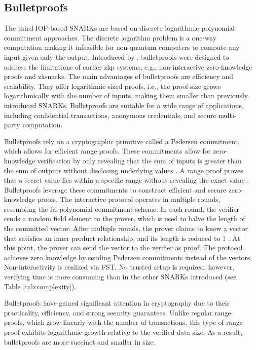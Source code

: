 \subsection{Bulletproofs}
The third IOP-based SNARKs are based on discrete logarithmic polynomial commitment approaches. The discrete logarithm problem is a one-way computation making it infeasible for non-quantum computers to compute any input given only the output. Introduced by \citet{bulletproofs}, bulletproofs were designed to address the limitations of earlier \acrshort{zkp} systems, e.g., non-interactive zero-knowledge proofs and \acrshort{zksnark}s. The main advantages of bulletproofs are efficiency and scalability. They offer logarithmic-sized proofs, i.e., the proof size grows logarithmically with the number of inputs, making them smaller than previously introduced SNARKs. Bulletproofs are suitable for a wide range of applications, including confidential transactions, anonymous credentials, and secure multi-party computation.

Bulletproofs rely on a cryptographic primitive called a Pedersen commitment, which allows for efficient range proofs. These commitments allow for zero-knowledge verification by only revealing that the sum of inputs is greater than the sum of outputs without disclosing underlying values \citep{rangepedersen}. A range proof proves that a secret value lies within a specific range without revealing the exact value \citep{Chung2022BulletproofsSP}. Bulletproofs leverage these commitments to construct efficient and secure zero-knowledge proofs. The interactive protocol operates in multiple rounds, resembling the \acrshort{fri} polynomial commitment scheme. In each round, the verifier sends a random field element to the prover, which is used to halve the length of the committed vector. After multiple rounds, the prover claims to know a vector that satisfies an inner product relationship, and its length is reduced to 1 \citep{Thaler, Godden}. At this point, the prover can send the vector to the verifier as proof. The protocol achieves zero knowledge by sending Pedersen commitments instead of the vectors. Non-interactivity is realized via FST. No trusted setup is required; however, verifying time is more consuming than in the other SNARKs introduced (see Table \ref{tab:complexity}). 

Bulletproofs have gained significant attention in cryptography due to their practicality, efficiency, and strong security guarantees. Unlike regular range proofs, which grow linearly with the number of transactions, this type of range proof exhibits logarithmic growth relative to the verified data size. As a result, bulletproofs are more succinct and smaller in size.

